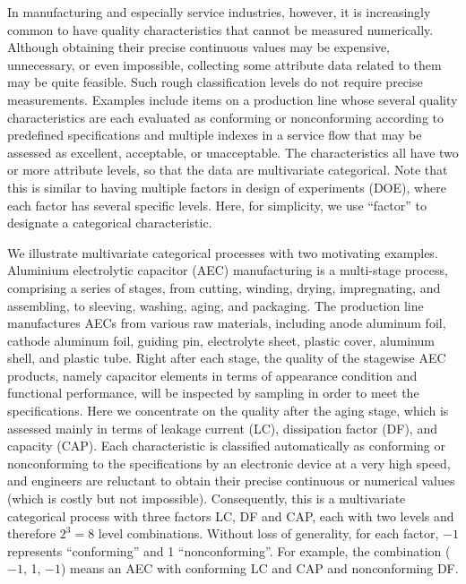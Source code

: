 In manufacturing and especially service industries, however, it is increasingly
common to have quality characteristics that cannot be measured numerically. Although
obtaining their precise continuous values may be expensive, unnecessary, or even
impossible, collecting some attribute data related to them may be quite feasible.
Such rough classification levels do not require precise measurements. Examples
include items on a production line whose several quality characteristics are each
evaluated as conforming or nonconforming according to predefined specifications and
multiple indexes in a service flow that may be assessed as excellent, acceptable, or
unacceptable. The characteristics all have two or more attribute levels, so that the
data are multivariate categorical. Note that this is similar to having multiple
factors in design of experiments (DOE), where each factor has several specific
levels. Here, for simplicity, we use ``factor'' to designate a categorical
characteristic.

We illustrate multivariate categorical processes with two motivating examples.
Aluminium electrolytic capacitor (AEC) manufacturing is a multi-stage process,
comprising a series of stages, from cutting, winding, drying, impregnating, and
assembling, to sleeving, washing, aging, and packaging. The production line
manufactures AECs from various raw materials, including anode aluminum foil, cathode
aluminum foil, guiding pin, electrolyte sheet, plastic cover, aluminum shell, and
plastic tube. Right after each stage, the quality of the stagewise AEC products,
namely capacitor elements in terms of appearance condition and functional
performance, will be inspected by sampling in order to meet the specifications. Here
we concentrate on the quality after the aging stage, which is assessed mainly in
terms of leakage current (LC), dissipation factor (DF), and capacity (CAP). Each
characteristic is classified automatically as conforming or nonconforming to the
specifications by an electronic device at a very high speed, and engineers are
reluctant to obtain their precise continuous or numerical values (which is costly
but not impossible). Consequently, this is a multivariate categorical process with
three factors LC, DF and CAP, each with two levels and therefore $2^3=8$ level
combinations. Without loss of generality, for each factor, $-1$ represents
``conforming'' and 1 ``nonconforming''. For example, the combination ($-1$, 1, $-1$)
means an AEC with conforming LC and CAP and nonconforming DF.

